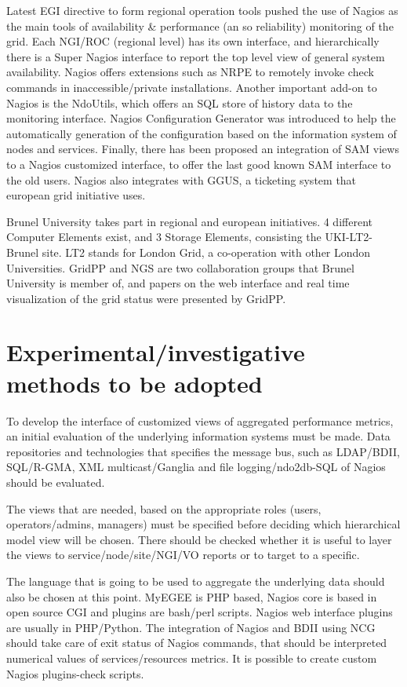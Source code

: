 Latest EGI directive to form regional operation tools pushed the use of Nagios \cite{imamagic2007grid} as the main tools of availability \& performance (an so reliability) monitoring of the grid. Each NGI/ROC (regional level) has its own interface, and hierarchically there is a Super Nagios interface to report the top level view of general system availability. Nagios offers extensions such as NRPE to remotely invoke check commands in inaccessible/private installations. Another important add-on to Nagios is the NdoUtils, which offers an SQL store of history data to the monitoring interface. Nagios Configuration Generator was introduced to help the automatically generation of the configuration based on the information system of nodes and services. Finally, there has been proposed an integration of SAM views to a Nagios customized interface, to offer the last good known SAM interface to the old users. Nagios also integrates with GGUS, a ticketing system that european grid initiative uses.

Brunel University takes part in regional and european initiatives. 4 different Computer Elements exist, and 3 Storage Elements, consisting the UKI-LT2-Brunel site. LT2 stands for London Grid, a co-operation with other London Universities. GridPP and NGS are two collaboration groups that Brunel University is member of, and papers on the web interface \cite{Hobson2007} and real time visualization of the grid status were presented \cite{Huang2007} by GridPP.

\section[Experimental]{Experimental/investigative methods to be adopted}

To develop the interface of customized views of aggregated performance metrics, an initial evaluation of the underlying information systems must be made. Data repositories and technologies that specifies the message bus, such as LDAP/BDII, SQL/R-GMA, XML multicast/Ganglia and file logging/ndo2db-SQL of Nagios should be evaluated. 

The views that are needed, based on the appropriate roles (users, operators/admins, managers) must be specified before deciding which hierarchical model view will be chosen. There should be checked whether it is useful to layer the views to service/node/site/NGI/VO reports or to target to a specific.

The language that is going to be used to aggregate the underlying data should also be chosen at this point. MyEGEE is PHP based, Nagios core is based in open source CGI and plugins are bash/perl scripts. Nagios web interface plugins are usually in PHP/Python. The integration of Nagios and BDII using NCG should take care of exit status of Nagios commands, that should be interpreted numerical values of services/resources metrics. It is possible to create custom Nagios plugins-check scripts. 

